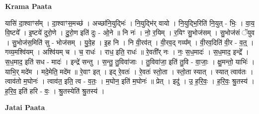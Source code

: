 \documentclass[17pt]{extarticle}
\begin{document}
\textbf{Krama Paata} \newline

यासि॑ दा॒श्वाꣳस᳚म् । दा॒श्वाꣳस॒मच्छ॑ । अच्छा॑नि॒युद्भिः॑ । नि॒युद्भि॑र् वायो । नि॒युद्भि॒रिति॑ नि॒युत् - भिः॒ । वा॒य॒ वि॒ष्टये᳚ । इ॒ष्टये॑ दुरो॒णे । दु॒रो॒ण इति॑ दुः - ओ॒ने ॥ नि नः॑ । नो॒ र॒यिम् । र॒यिꣳ सु॒भोज॑सम् । सु॒भोज॑सं ॅयुव । सु॒भोज॑स॒मिति॑ सु - भोज॑सम् । यु॒वे॒ह । इ॒ह नि । नि वी॒रव॑त् । वी॒रव॒द् गव्य᳚म् । वी॒रव॒दिति॑ वी॒र - व॒त्॒ । गव्य॒मश्वि॑यम् । अश्वि॑यम् च । च॒ राधः॑ । राध॒ इति॒ राधः॑ ॥ रे॒वती᳚र् नः । नः॒ स॒ध॒मादः॑ । स॒ध॒माद॒ इन्द्रे᳚ । स॒ध॒माद॒ इति॑ सध - मादः॑ । इन्द्रे॑ सन्तु । स॒न्तु॒ तु॒विवा॑जाः । तु॒विवा॑जा॒ इति॑ तु॒वि - वा॒जाः॒ । क्षु॒मन्तो॒ याभिः॑ । याभि॒र् मदे॑म । मदे॒मेति॒ मदे॑म ॥ रे॒वाꣳ इत् । इद् रे॒वतः॑ । रे॒वतः॑ स्तो॒ता । स्तो॒ता स्यात् । स्यात् त्वाव॑तः । त्वाव॑तो म॒घोनः॑ । त्वाव॑त॒ इति॒ त्व - व॒तः॒ । म॒घोन॒ इति॑ म॒घोनः॑ ॥ प्रेत् । इदु॑ । उ॒ ह॒रि॒वः॒ । ह॒रि॒वः॒ श्रु॒तस्य॑ । ह॒रि॒व॒ इति॑ हरि - वः॒ । श्रु॒तस्येति॑ श्रु॒तस्य॑ । \newline

\textbf{Jatai Paata} \newline
\end{document}

